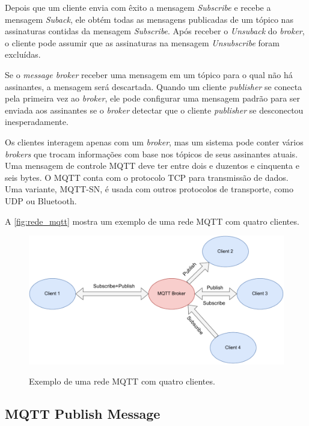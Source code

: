 Depois que um cliente envia com êxito a mensagem \textit{Subscribe} e recebe a mensagem \textit{Suback}, ele obtém todas as mensagens publicadas de um tópico nas assinaturas contidas da mensagem \textit{Subscribe}. Após receber o \textit{Unsuback} do \textit{broker}, o cliente pode assumir que as assinaturas na mensagem \textit{Unsubscribe} foram excluídas.

Se o \textit{message broker} receber uma mensagem em um tópico para o qual não há assinantes, a mensagem será descartada. Quando um cliente \textit{publisher} se conecta pela primeira vez ao \textit{broker}, ele pode configurar uma mensagem padrão para ser enviada aos assinantes se o \textit{broker} detectar que o cliente \textit{publisher} se desconectou inesperadamente.

Os clientes interagem apenas com um \textit{broker}, mas um sistema pode conter vários \textit{brokers} que trocam informações com base nos tópicos de seus assinantes atuais. Uma mensagem de controle MQTT deve ter entre dois e duzentos e cinquenta e seis bytes. O MQTT conta com o protocolo TCP para transmissão de dados. Uma variante, MQTT-SN, é usada com outros protocolos de transporte, como UDP ou Bluetooth.

A \autoref{fig:rede_mqtt} mostra um exemplo de uma rede MQTT com quatro clientes.

\begin{figure}[htbp]
	\centering
	\caption{Exemplo de uma rede MQTT com quatro clientes.}
	\includegraphics[scale=0.7]{Imagens/mqtt_protocol.pdf}
	\label{fig:rede_mqtt}
\end{figure}

\subsection{MQTT Publish Message}\label{subsection:mqtt_publish_message}

